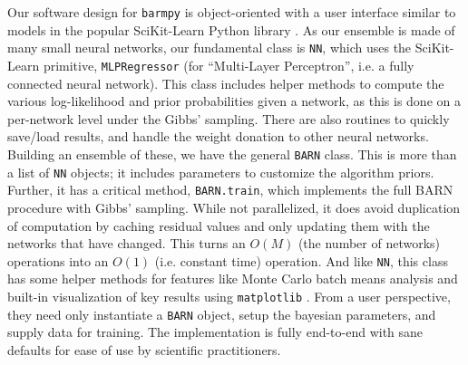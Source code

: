 \documentclass[12pt]{article}
\begin{document}
Our software design for \texttt{barmpy} is object-oriented with a user interface similar to models in the popular SciKit-Learn Python library \cite{scikit-learn}.  As our ensemble is made of many small neural networks, our fundamental class is \texttt{NN}, which uses the SciKit-Learn primitive, \texttt{MLPRegressor} (for ``Multi-Layer Perceptron'', i.e. a fully connected neural network).  This class includes helper methods to compute the various log-likelihood and prior probabilities given a network, as this is done on a per-network level under the Gibbs' sampling.  There are also routines to quickly save/load results, and handle the weight donation to other neural networks.  Building an ensemble of these, we have the general \texttt{BARN} class.  This is more than a list of \texttt{NN} objects; it includes parameters to customize the algorithm priors.  Further, it has a critical method, \texttt{BARN.train}, which implements the full BARN procedure with Gibbs' sampling.  While not parallelized, it does avoid duplication of computation by caching residual values and only updating them with the networks that have changed.  This turns an $O(M)$ (the number of networks) operations into an $O(1)$ (i.e. constant time) operation.  And like \texttt{NN}, this class has some helper methods for features like Monte Carlo batch means analysis and built-in visualization of key results using \texttt{matplotlib} \cite{Hunter:2007}.  From a user perspective, they need only instantiate a \texttt{BARN} object, setup the bayesian parameters, and supply data for training.  The implementation is fully end-to-end with sane defaults for ease of use by scientific practitioners.
\end{document}
